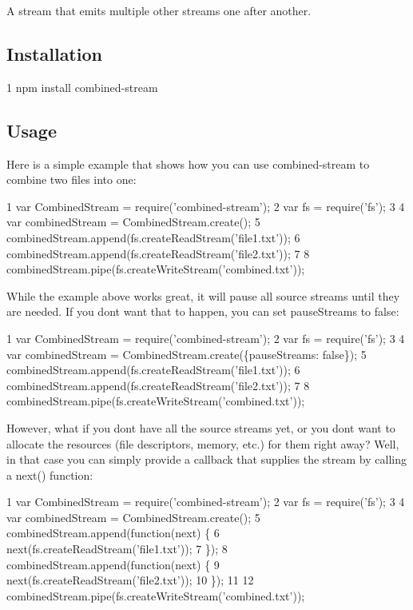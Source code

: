A stream that emits multiple other streams one after another.

\subsection*{Installation}


\begin{DoxyCode}
1 npm install combined-stream
\end{DoxyCode}


\subsection*{Usage}

Here is a simple example that shows how you can use combined-\/stream to combine two files into one\+:


\begin{DoxyCode}
1 var CombinedStream = require('combined-stream');
2 var fs = require('fs');
3 
4 var combinedStream = CombinedStream.create();
5 combinedStream.append(fs.createReadStream('file1.txt'));
6 combinedStream.append(fs.createReadStream('file2.txt'));
7 
8 combinedStream.pipe(fs.createWriteStream('combined.txt'));
\end{DoxyCode}


While the example above works great, it will pause all source streams until they are needed. If you don\textquotesingle{}t want that to happen, you can set {\ttfamily pause\+Streams} to {\ttfamily false}\+:


\begin{DoxyCode}
1 var CombinedStream = require('combined-stream');
2 var fs = require('fs');
3 
4 var combinedStream = CombinedStream.create(\{pauseStreams: false\});
5 combinedStream.append(fs.createReadStream('file1.txt'));
6 combinedStream.append(fs.createReadStream('file2.txt'));
7 
8 combinedStream.pipe(fs.createWriteStream('combined.txt'));
\end{DoxyCode}


However, what if you don\textquotesingle{}t have all the source streams yet, or you don\textquotesingle{}t want to allocate the resources (file descriptors, memory, etc.) for them right away? Well, in that case you can simply provide a callback that supplies the stream by calling a {\ttfamily next()} function\+:


\begin{DoxyCode}
1 var CombinedStream = require('combined-stream');
2 var fs = require('fs');
3 
4 var combinedStream = CombinedStream.create();
5 combinedStream.append(function(next) \{
6   next(fs.createReadStream('file1.txt'));
7 \});
8 combinedStream.append(function(next) \{
9   next(fs.createReadStream('file2.txt'));
10 \});
11 
12 combinedStream.pipe(fs.createWriteStream('combined.txt'));
\end{DoxyCode}


